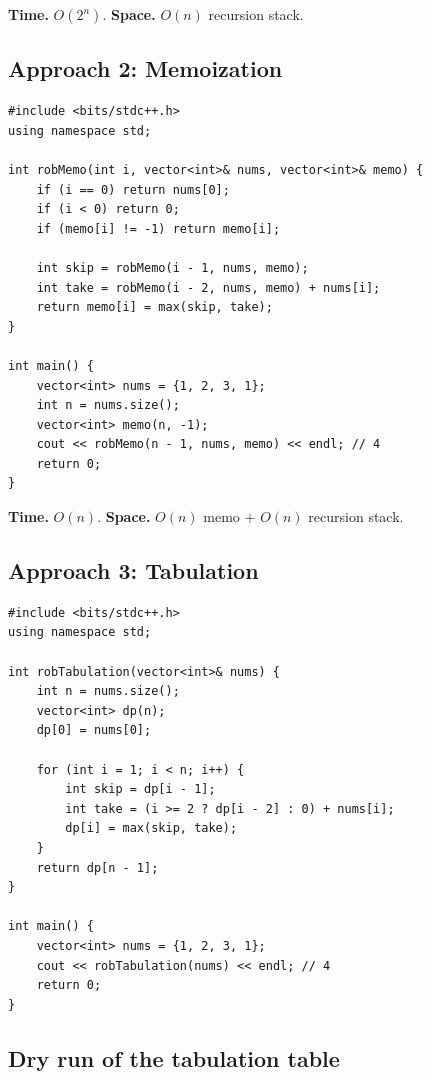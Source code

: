 \begin{complexitybox}
\textbf{Time.} $O(2^n)$.
\textbf{Space.} $O(n)$ recursion stack.
\end{complexitybox}

\subsection*{Approach 2: Memoization}

\begin{lstlisting}
#include <bits/stdc++.h>
using namespace std;

int robMemo(int i, vector<int>& nums, vector<int>& memo) {
    if (i == 0) return nums[0];
    if (i < 0) return 0;
    if (memo[i] != -1) return memo[i];

    int skip = robMemo(i - 1, nums, memo);
    int take = robMemo(i - 2, nums, memo) + nums[i];
    return memo[i] = max(skip, take);
}

int main() {
    vector<int> nums = {1, 2, 3, 1};
    int n = nums.size();
    vector<int> memo(n, -1);
    cout << robMemo(n - 1, nums, memo) << endl; // 4
    return 0;
}
\end{lstlisting}

\begin{complexitybox}
\textbf{Time.} $O(n)$.
\textbf{Space.} $O(n)$ memo $+$ $O(n)$ recursion stack.
\end{complexitybox}

\subsection*{Approach 3: Tabulation}

\begin{lstlisting}
#include <bits/stdc++.h>
using namespace std;

int robTabulation(vector<int>& nums) {
    int n = nums.size();
    vector<int> dp(n);
    dp[0] = nums[0];

    for (int i = 1; i < n; i++) {
        int skip = dp[i - 1];
        int take = (i >= 2 ? dp[i - 2] : 0) + nums[i];
        dp[i] = max(skip, take);
    }
    return dp[n - 1];
}

int main() {
    vector<int> nums = {1, 2, 3, 1};
    cout << robTabulation(nums) << endl; // 4
    return 0;
}
\end{lstlisting}

\subsection*{Dry run of the tabulation table}

